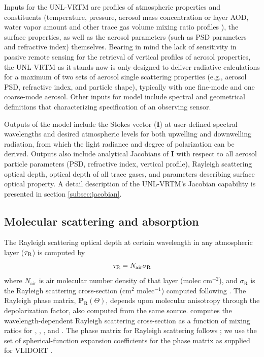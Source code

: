 Inputs for the UNL-VRTM are profiles of atmospheric properties and
constituents (temperature, pressure, aerosol mass concentration or layer
AOD, water vapor amount and other trace gas volume mixing ratio
profiles \citep{McClatchey72}), the surface properties, as well as 
the aerosol parameters  (such as PSD parameters and refractive index)
themselves. Bearing in mind the lack of
sensitivity in passive remote sensing for the retrieval of vertical
profiles of aerosol properties, the UNL-VRTM as it stands now is only
designed to deliver radiative calculations for a maximum of two sets of
aerosol single scattering properties (e.g., aerosol PSD,
refractive index, and particle shape), typically with one fine-mode and
one coarse-mode aerosol. Other inputs for model include spectral and
geometrical definitions that characterizing specification of an
observing sensor. 

Outputs of the model include the Stokes vector ($\mathbf{I}$) at
user-defined spectral wavelengths and desired atmospheric
levels for both upwelling and downwelling radiation, from which the
light radiance and degree of polarization can be derived. Outputs also
include analytical Jacobians of $\mathbf{I}$ with respect to all aerosol
particle parameters (PSD, refractive index, vertical profile), Rayleigh
scattering optical depth, optical depth of all trace gases, and
parameters describing surface optical property. A detail description of
the UNL-VRTM's Jacobian capability is presented in section
\ref{subsec:jacobian}. 

\subsection{Molecular scattering and absorption} \label{subsec:rayleigh}

The Rayleigh scattering optical depth at certain wavelength in any 
atmospheric layer ($\tau_\text{R}$) is computed by
\begin{equation}
\tau_\text{R} = N_\text{air}\sigma_\text{R} 
\end{equation}
where $N_\text{air}$ is air molecular number density of that layer
(molec cm$^{-2}$), and $\sigma_\text{R}$ is the Rayleigh scattering 
cross-section (cm$^2$ molec$^{-1}$) computed following
\citet{Bodhaine99}. The Rayleigh phase matrix,
$\mathbf{P}_\text{R}(\Theta)$, depends upon molecular 
anisotropy through the depolarization factor, also computed from the same 
source. \citet{Bodhaine99} computes the wavelength-dependent Rayleigh
scattering cross-section as a function of mixing ratios for ,
, , and . The phase matrix for Rayleigh scattering
follows \citet{Hansen74}; we use the set of spherical-function expansion
 coefficients for the phase matrix as supplied for VLIDORT
\citep{Spurr06}.

